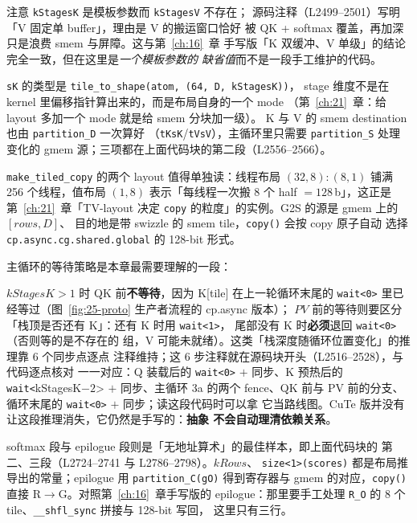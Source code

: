 注意 \texttt{kStagesK} 是模板参数而 \texttt{kStagesV} 不存在；
源码注释（L2499--2501）写明「V 固定单 buffer」，理由是 V 的搬运窗口恰好
被 QK + softmax 覆盖，再加深只是浪费 smem 与屏障。这与第~\ref{ch:16}~章
手写版「K 双缓冲、V 单级」的结论完全一致，但在这里是\emph{一个模板参数的
缺省值}而不是一段手工维护的代码。

\texttt{sK} 的类型是 \texttt{tile\_\allowbreak{}to\_\allowbreak{}shape\allowbreak{}(atom,\allowbreak{} (64,\allowbreak{} D,\allowbreak{} k\allowbreak{}Stages\allowbreak{}K))}，
stage 维度不是在 kernel 里偏移指针算出来的，而是布局自身的一个 mode
（第~\ref{ch:21}~章：给 layout 多加一个 mode 就是给 smem 分块加一级）。
K 与 V 的 smem destination 也由 \texttt{partition\_D} 一次算好
（\texttt{tKsK}/\texttt{tVsV}），主循环里只需要 \texttt{partition\_S}
处理变化的 gmem 源；三项都在上面代码块的第二段（L2556--2566）。

\texttt{make\_\allowbreak{}tiled\_\allowbreak{}copy} 的两个 layout 值得单独读：线程布局
$(32,8){:}(8,1)$ 铺满 256 个线程，值布局 $(1,8)$ 表示「每线程一次搬
8 个 half $=128$\,b」，这正是第~\ref{ch:21}~章「TV-layout 决定
\texttt{copy} 的粒度」的实例。G2S 的源是 gmem 上的 $[rows, D]$、
目的地是带 swizzle 的 smem tile，\texttt{copy()} 会按 copy 原子自动
选择 \texttt{cp.\allowbreak{}async.\allowbreak{}cg.\allowbreak{}shared.\allowbreak{}global} 的 128-bit 形式。

主循环的等待策略是本章最需要理解的一段：



$kStagesK>1$ 时 QK 前\textbf{不等待}，因为 K[tile] 在上一轮循环末尾的
\texttt{wait<0>} 里已经等过（图~\ref{fig:25-proto} 生产者流程的 cp.async 版本）；
$PV$ 前的等待则要区分「栈顶是否还有 K」：还有 K 时用 \texttt{wait<1>}，
尾部没有 K 时\textbf{必须}退回 \texttt{wait<0>}（否则等的是不存在的
组，V 可能未就绪）。这类「栈深度随循环位置变化」的推理靠 6 个同步点逐点
注释维持；这 6 步注释就在源码块开头（L2516--2528），与代码逐点核对
一一对应：Q 装载后的 \texttt{wait<0>} $+$ 同步、K 预热后的
\texttt{wait<}kStagesK${-}2$> $+$ 同步、主循环 3a 的两个 fence、QK 前与
PV 前的分支、循环末尾的 \texttt{wait<0>} $+$ 同步；读这段代码时可以拿
它当路线图。CuTe 版并没有让这段推理消失，它仍然是手写的：\textbf{抽象
不会自动理清依赖关系}。

softmax 段与 epilogue 段则是「无地址算术」的最佳样本，即上面代码块的
第二、三段（L2724--2741 与 L2786--2798）。$kRows$、
\texttt{size\allowbreak{}<1>\allowbreak{}(scores)} 都是布局推导出的常量；epilogue 用
\texttt{partition\_\allowbreak{}C\allowbreak{}(g\allowbreak{}O)} 得到寄存器与 gmem 的对应，\texttt{copy()} 直接
R$\to$G。对照第~\ref{ch:16}~章手写版的 epilogue：那里要手工处理
\texttt{R\_O} 的 8 个 tile、\texttt{\_\_shfl\_sync} 拼接与 128-bit 写回，
这里只有三行。

